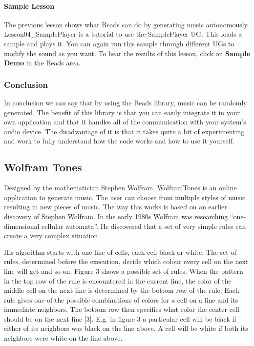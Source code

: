 \documentclass[12pt]{article}
\begin{document}
\paragraph{Sample Lesson}

The previous lesson shows what Beads can do by generating music autonomously. Lesson04\_SamplePlayer is a tutorial to use the SamplePlayer UG. This loads a sample and plays it. You can again run this sample through different UGs to modify the sound as you want. To hear the results of this lesson, click on \textbf{Sample Demo} in the Beads area. 

\subsubsection{Conclusion}

In conclusion we can say that by using the Beads library, music can be randomly generated. The benefit of this library is that you can easily integrate it in your own application and that it handles all of the communication with your system's audio device. The disadvantage of it is that it takes quite a bit of experimenting and work to fully understand how the code works and how to use it yourself.

\subsection{Wolfram Tones}

Designed by the mathematician Stephen Wolfram, WolframTones is an online application to generate music. The user can choose from multiple styles of music resulting in new pieces of music. The way this works is based on an earlier discovery of Stephen Wolfram. In the early 1980s Wolfram was researching ``one-dimensional cellular automata''. He discovered that a set of very simple rules can create a very complex situation. 
\newline

His algorithm starts with one line of cells, each cell black or white. The set of rules, determined before the execution, decide which colour every cell on the next line will get and so on. Figure 3 shows a possible set of rules. When the pattern in the top row of the rule is encountered in the current line, the color of the middle cell on the next line is determined by the bottom row of the rule. Each rule gives one of the possible combinations of colors for a cell on a line and its immediate neighbors. The bottom row then specifies what color the center cell should be on the next line [3]. E.g. in figure 3 a particular cell will be black if either of its neighbors was black on the line above. A cell will be white if both its neighbors were white on the line above.
\end{document}
